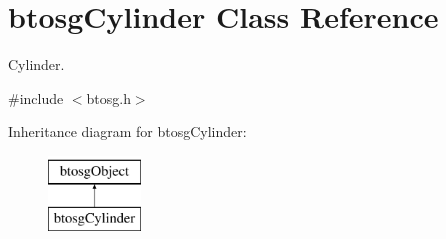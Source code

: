 \hypertarget{classbtosgCylinder}{}\section{btosg\+Cylinder Class Reference}
\label{classbtosgCylinder}


Cylinder.  




{\ttfamily \#include $<$btosg.\+h$>$}

Inheritance diagram for btosg\+Cylinder\+:\begin{figure}[H]
\begin{center}
\leavevmode
\includegraphics[height=2.000000cm]{classbtosgCylinder}
\end{center}
\end{figure}
